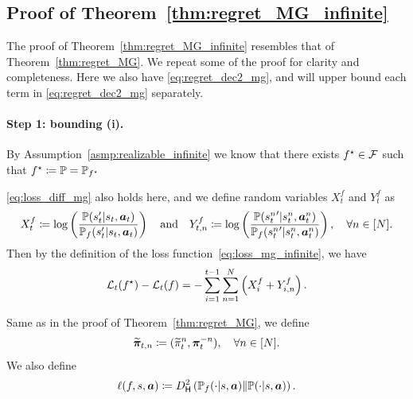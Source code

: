 \subsection{Proof of Theorem~\ref{thm:regret_MG_infinite}}\label{app:proof_thm_regret_MP_infinite}

The proof of Theorem~\ref{thm:regret_MG_infinite} resembles that of Theorem~\ref{thm:regret_MG}. We repeat some of the proof for clarity and completeness.
Here we also have \eqref{eq:regret_dec2_mg}, and will upper bound each term in \eqref{eq:regret_dec2_mg} separately.

\paragraph{Step 1: bounding (i).} 
By Assumption~\ref{asmp:realizable_infinite} we know that there exists $f^\star\in{\mathcal{F}}$ such that $f^\star\coloneqq {\mathbb P} = {\mathbb P}_{f^\star}$

 \eqref{eq:loss_diff_mg} also holds here, and we define random variables $X_t^f$ and $Y_t^f$ as
\begin{align}\label{eq:X_t_mg_infinite}
    X_t^f\coloneqq \log \left(\frac{{\mathbb P}(s'_t|s_t,{\bm{a}}_t)}{{\mathbb P}_f(s'_t|s_t,{\bm{a}}_t)}\right)\quad\text{and}\quad Y_{t,n}^f\coloneqq \log \left(\frac{{\mathbb P}({s_t^n}'|s_t^n,{\bm{a}}_t^n)}{{\mathbb P}_f({s_t^n}'|s_t^n,{\bm{a}}_t^n)}\right),\quad \forall n\in[N].
\end{align}
Then by the definition of the loss function~\eqref{eq:loss_mg_infinite}, we have
\begin{align}\label{eq:loss_diff_decompose_mg_infinite}
    {\mathcal{L}}_t(f^\star)-{\mathcal{L}}_t(f) = -\sum_{i=1}^{t-1}\sum_{n=1}^N \left(X_i^f+Y_{i,n}^f\right).
\end{align}

Same as in the proof of Theorem~\ref{thm:regret_MG}, we define
\begin{align}\label{eq:pi_t_n_infinite}
    \widetilde{{\bm{\pi}}}_{t,n}\coloneqq (\widetilde{\pi}_t^n, {\bm{\pi}}_t^{-n}),\quad \forall n\in[N].
\end{align}
We also define
\begin{align}\label{eq:Hellinger_loss_infinite}
    \ell(f,s,{\bm{a}})\coloneqq D_{\mathsf{H}}^2\left({\mathbb P}_{f}(\cdot|s,{\bm{a}})\|{\mathbb P}(\cdot|s,{\bm{a}})\right).
\end{align}

